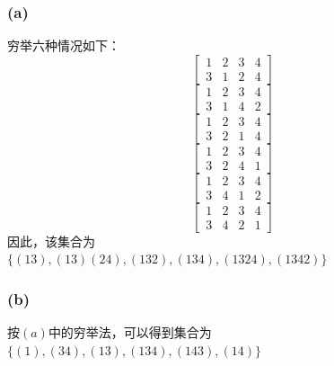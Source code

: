 \documentclass[twocolumn]{article}
\newenvironment{SChinese}{
	\CJKfamily{gbsn}
	\CJKtilde
	\CJKnospace}{}
\begin{document}
\begin{CJK}{UTF8}{}
\begin{SChinese}
					\subsubsection*{(a)}
						穷举六种情况如下：
						\begin{displaymath}
							\left [\begin{matrix}
							1 & 2 & 3 & 4 \\
							3 & 1 & 2 & 4   
							\end{matrix}\right]
						\end{displaymath}
						\begin{displaymath}
						\left [\begin{matrix}
						1 & 2 & 3 & 4 \\
						3 & 1 & 4 & 2   
						\end{matrix}\right]
						\end{displaymath}
						\begin{displaymath}
						\left [\begin{matrix}
						1 & 2 & 3 & 4 \\
						3 & 2 & 1 & 4   
						\end{matrix}\right]
						\end{displaymath}
						\begin{displaymath}
						\left [\begin{matrix}
						1 & 2 & 3 & 4 \\
						3 & 2 & 4 & 1   
						\end{matrix}\right]
						\end{displaymath}
						\begin{displaymath}
						\left [\begin{matrix}
						1 & 2 & 3 & 4 \\
						3 & 4 & 1 & 2   
						\end{matrix}\right]
						\end{displaymath}
						\begin{displaymath}
						\left [\begin{matrix}
						1 & 2 & 3 & 4 \\
						3 & 4 & 2 & 1   
						\end{matrix}\right]
						\end{displaymath}
						因此，该集合为\\$\{(13),(13)(24),(132),(134),(1324),(1342)\}$
					\subsubsection*{(b)}
						按$(a)$中的穷举法，可以得到集合为$\{(1),(34),(13),(134),(143),(14)\}$

\end{SChinese}
\end{CJK}
\end{document}
